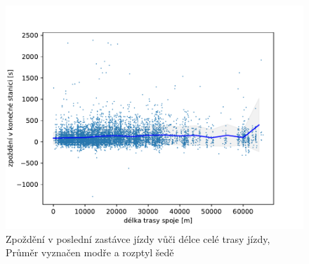 \begin{figure}
	\centering
  \includegraphics[width=1\linewidth]{../img/trips_total_delay}
  \caption{Zpoždění v poslední zastávce jízdy vůči délce celé trasy jízdy, Průměr vyznačen modře a rozptyl šedě}
  \label{fig:trips_total_delay}
\end{figure}
